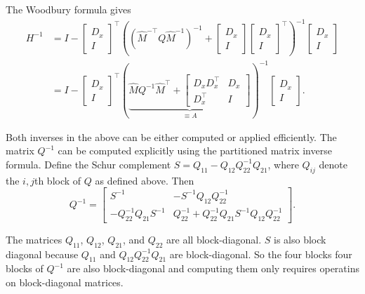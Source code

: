 \documentclass{article}
\begin{document}
The Woodbury formula gives
\begin{align}
    H^{-1} & = I -
    \begin{bmatrix}
        D_x \\ I
    \end{bmatrix}
    ^\top
    \left( \left(\hat{M}^{-\top} Q \hat{M}^{-1}\right)^{-1} +
    \begin{bmatrix}
        D_x \\ I
    \end{bmatrix}
    \begin{bmatrix}
        D_x \\ I
    \end{bmatrix}
    ^\top
    \right)^{-1}
    \begin{bmatrix}
        D_x \\ I
    \end{bmatrix}
    \nonumber      \\
    & = I -
    \begin{bmatrix}
        D_x \\ I
    \end{bmatrix}
    ^\top
    \left(\underbrace{
        \hat{M} Q^{-1} \hat{M}^\top
        +
        \begin{bmatrix}
            D_x D_x^\top & D_x \\
            D_x^\top     & I
        \end{bmatrix}
    }_{\equiv A}\right)^{-1}
    \begin{bmatrix}
        D_x \\ I
    \end{bmatrix}
    .
\end{align}

Both inverses in the above can be either computed or applied efficiently. The matrix $Q^{-1}$ can be computed
explicitly using the partitioned matrix inverse formula. Define the Schur complement $S = Q_{11} - Q_{12} Q_{22}^{-1}
    Q_{21}$, where $Q_{ij}$ denote the $i,j$th block of $Q$ as defined above. Then
\begin{equation}
    Q^{-1} =
    \begin{bmatrix}
        S^{-1}                      & -S^{-1} Q_{12} Q_{22}^{-1}                                 \\
        - Q_{22}^{-1} Q_{21} S^{-1} & Q_{22}^{-1} + Q_{22}^{-1} Q_{21} S^{-1} Q_{12} Q_{22}^{-1}
    \end{bmatrix}
    .
\end{equation}

The matrices $Q_{11}$, $Q_{12}$, $Q_{21}$, and $Q_{22}$ are all block-diagonal. $S$ is also block diagonal because
$Q_{11}$ and $Q_{12} Q_{22}^{-1} Q_{21}$ are block-diagonal. So the four blocks four blocks of $Q^{-1}$ are also
block-diagonal and computing them only requires operatins on block-diagonal matrices.
\end{document}
